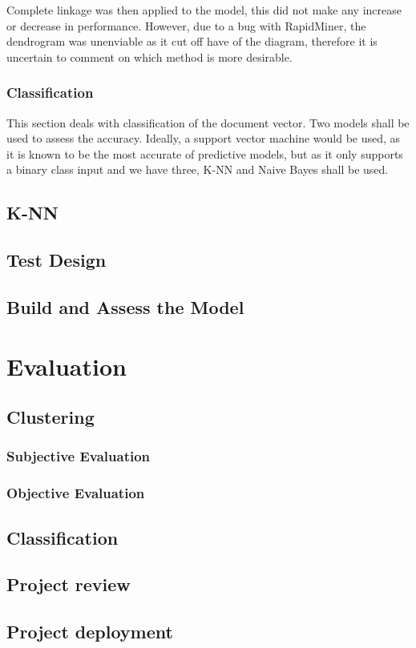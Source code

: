 Complete linkage was then applied to the model, this did not make any increase or decrease in performance. However, due to a bug with RapidMiner, the dendrogram was unenviable as it cut off have of the diagram, therefore it is uncertain to comment on which method is more desirable. 



\subsubsection*{Classification}
This section deals with classification of the document vector. Two models shall be used to assess the accuracy. Ideally, a support vector machine would be used, as it is known to be the most accurate of predictive models, but as it only supports a binary class input and we have three, K-NN and Naive Bayes shall be used.
\subsection*{K-NN}



\subsection*{Test Design}

\subsection*{Build and Assess the Model}


\section*{Evaluation}

\subsection*{Clustering}
\subsubsection*{Subjective Evaluation}
\subsubsection*{Objective Evaluation}

\subsection*{Classification}

\subsection*{Project review}

\subsection*{Project deployment}


